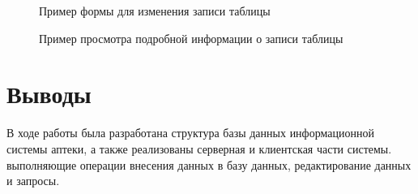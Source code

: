 \documentclass[a4paper]{article}
\begin{document}
				\begin{figure}[H]
					\centering
					\caption{Пример формы для изменения записи таблицы}
				\end{figure}
				
				\begin{figure}[H]
					\centering
					\caption{Пример просмотра подробной информации о записи таблицы}
				\end{figure}
		
	\newpage
				
	\section{Выводы}
		В ходе работы была разработана структура базы данных информационной системы аптеки, а также реализованы серверная и клиентская части системы. выполняющие операции внесения данных в базу данных, редактирование данных и запросы.
\end{document}
